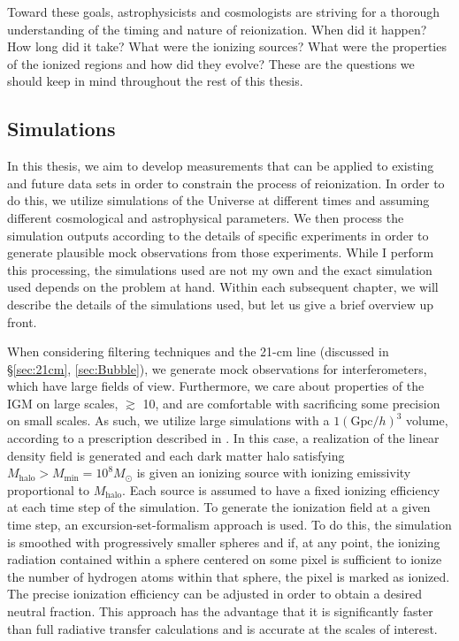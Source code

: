 Toward these goals, astrophysicists and cosmologists are striving for a thorough understanding of the timing and nature of reionization. When did it happen? How long did it take? What were the ionizing sources? What were the properties of the ionized regions and how did they evolve? These are the questions we should keep in mind throughout the rest of this thesis.

\clearpage
\subsection{Simulations}

In this thesis, we aim to develop measurements that can be applied to existing and future data sets in order to constrain the process of reionization.  In order to do this, we utilize simulations of the Universe at different times and assuming different cosmological and astrophysical parameters. We then process the simulation outputs according to the details of specific experiments in order to generate plausible mock observations from those experiments. While I perform this processing, the simulations used are not my own and the exact simulation used depends on the problem at hand. Within each subsequent chapter, we will describe the details of the simulations used, but let us give a brief overview up front.


When considering filtering techniques and the 21-cm line (discussed in \S \ref{sec:21cm}, \ref{sec:Bubble}), we generate mock observations for interferometers, which have large fields of view. Furthermore, we care about properties of the IGM on large scales, $\gtrsim$ 10\mpch, and are comfortable with sacrificing some precision on small scales. As such, we utilize large simulations with a $1 (\text{Gpc}/h)^{3}$ volume, according to a prescription described in \cite{Zahn2006}. In this case, a realization of the linear density field is generated and each dark matter halo satisfying $M_{\text{halo}} > M_{\text{min}} = 10^{8}M_{\odot}$ is given an ionizing source with ionizing emissivity proportional to $M_{\text{halo}}$. Each source is assumed to have a fixed ionizing efficiency at each time step of the simulation.  To generate the ionization field at a given time step, an excursion-set-formalism approach is used. To do this, the simulation is smoothed with progressively smaller spheres and if, at any point, the ionizing radiation contained within a sphere centered on some pixel is sufficient to ionize the number of hydrogen atoms within that sphere, the pixel is marked as ionized. The precise ionization efficiency can be adjusted in order to obtain a desired neutral fraction. This approach has the advantage that it is significantly faster than full radiative transfer calculations and is accurate at the scales of interest. 


